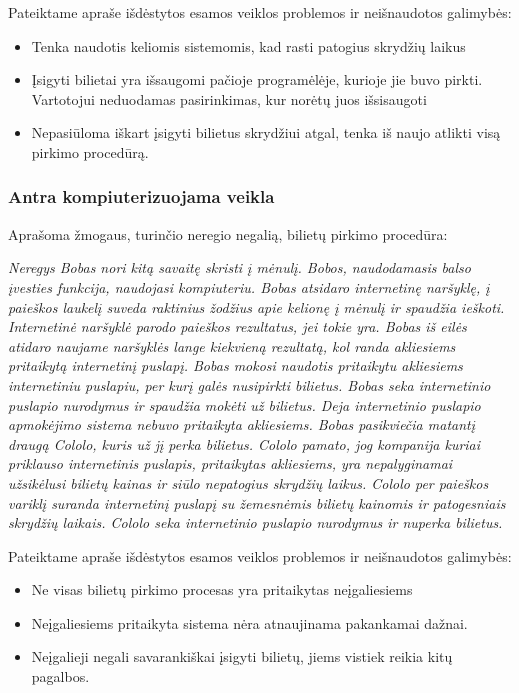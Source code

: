 \documentclass{VUMIFPSkursinis}
\begin{document}
\bigskip
Pateiktame apraše išdėstytos esamos veiklos problemos ir neišnaudotos galimybės:  
\begin{itemize}
\item Tenka naudotis keliomis sistemomis, kad rasti patogius skrydžių laikus
\item Įsigyti bilietai yra išsaugomi pačioje programėlėje, kurioje jie buvo pirkti. Vartotojui neduodamas pasirinkimas, kur norėtų juos išsisaugoti
\item Nepasiūloma iškart įsigyti bilietus skrydžiui atgal, tenka iš naujo atlikti visą pirkimo procedūrą.
\end{itemize}

\subsubsection{Antra kompiuterizuojama veikla}
Aprašoma žmogaus, turinčio neregio negalią, bilietų pirkimo procedūra:

\bigskip
\textit{Neregys Bobas nori kitą savaitę skristi į mėnulį. Bobos, naudodamasis balso įvesties funkcija, naudojasi kompiuteriu. Bobas atsidaro internetinę naršyklę, į paieškos laukelį suveda raktinius žodžius apie kelionę į mėnulį ir spaudžia ieškoti. Internetinė naršyklė parodo paieškos rezultatus, jei tokie yra. Bobas iš eilės atidaro naujame naršyklės lange kiekvieną rezultatą, kol randa akliesiems pritaikytą internetinį puslapį. Bobas mokosi naudotis pritaikytu akliesiems internetiniu puslapiu, per kurį galės nusipirkti bilietus. Bobas seka internetinio puslapio nurodymus ir spaudžia mokėti už bilietus. Deja internetinio puslapio apmokėjimo sistema nebuvo pritaikyta akliesiems. Bobas pasikviečia matantį draugą Cololo, kuris už jį perka bilietus. Cololo pamato, jog kompanija kuriai priklauso internetinis puslapis, pritaikytas akliesiems, yra nepalyginamai užsikėlusi bilietų kainas ir siūlo nepatogius skrydžių laikus. Cololo per paieškos variklį suranda internetinį puslapį su žemesnėmis bilietų kainomis ir patogesniais skrydžių laikais. Cololo seka internetinio puslapio nurodymus ir nuperka bilietus.}

\bigskip
Pateiktame apraše išdėstytos esamos veiklos problemos ir neišnaudotos galimybės:  
\begin{itemize}
\item Ne visas bilietų pirkimo procesas yra pritaikytas neįgaliesiems
\item Neįgaliesiems pritaikyta sistema nėra atnaujinama pakankamai dažnai.
\item Neįgalieji negali savarankiškai įsigyti bilietų, jiems vistiek reikia kitų pagalbos.
\end{itemize}
\end{document}
